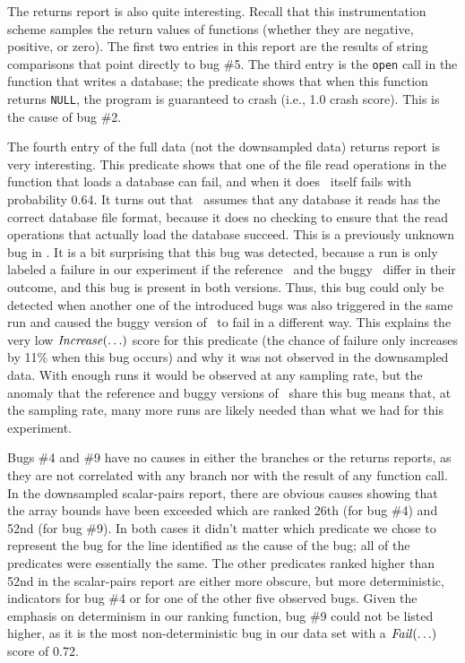 The returns report is also quite interesting.  Recall that this
instrumentation scheme samples the return values of functions (whether
they are negative, positive, or zero).  The first two entries in this
report are the results of string comparisons that point directly to bug
\#5.  The third entry is the {\tt open} call in the function that writes
a database; the predicate shows that when this function returns {\tt NULL},
the program is guaranteed to crash (i.e., 1.0 crash score).  This is the
cause of bug \#2.

The fourth entry of the full data (not the  downsampled data)
returns report is very interesting.  This predicate shows that one of
the file read operations in the function that loads a database can
fail, and when it does \moss\ itself fails with probability 0.64.
It turns out that \moss\ assumes that any database it reads has the
correct database file format, because it does no checking to ensure
that the read operations that actually load the database succeed.  This is a previously
unknown bug in \moss.  It is a bit surprising that this bug was detected,
because a run is only labeled a failure in our experiment if the
reference \moss\ and the buggy \moss\ differ in their outcome, and
this bug is present in both versions.  Thus, this bug could only be detected
when another one of the introduced bugs was also triggered in the same
run and caused the buggy version of \moss\ to fail in a different way.
This explains the very low $\mbox{\textit{Increase}}(\ldots)$ score for this
predicate (the chance of failure only increases by 11\% when this bug
occurs) and why it was not observed in the 
downsampled data.  With enough runs it would be observed at
any sampling rate, but the anomaly that the reference and buggy
versions of \moss\ share this bug means that, at the
 sampling rate, many more runs are likely needed
than what we had for this experiment.

Bugs \#4 and \#9 have no causes in either the branches or the returns
reports, as they are not correlated with any branch nor with the
result of any function call.  In the  downsampled
scalar-pairs report, there are obvious causes showing that the array
bounds have been exceeded which are ranked 26th (for bug \#4) and 52nd (for bug
\#9).  In both cases it didn't matter which predicate we chose to
represent the bug for the line identified as the cause of the bug; all
of the predicates were essentially the same.  The other
predicates ranked higher than 52nd in the scalar-pairs report are
either more obscure, but more deterministic, indicators for bug \#4 or
for one of the other five observed bugs.  Given the emphasis on
determinism in our ranking function, bug \#9 could not be listed
higher, as it is the most non-deterministic bug in our data set with a
$\mbox{\textit{Fail}}(\ldots)$ score of 0.72.

